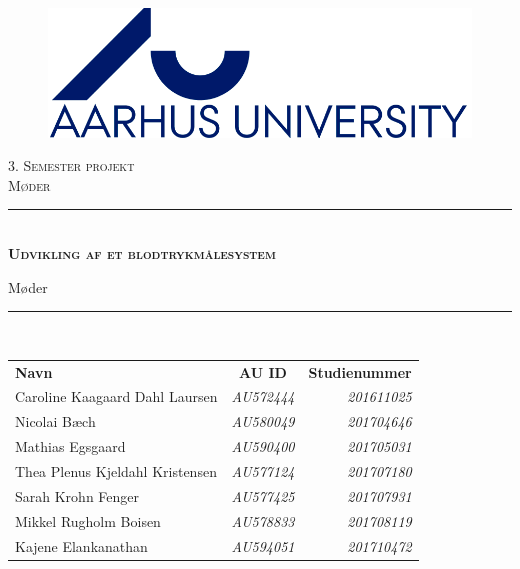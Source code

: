 \thispagestyle{empty}
\newcommand{\HRule}{\rule{\linewidth}{0.1mm}} %

\begin{center}
	\vspace{5cm}
	
	\begin{figure}[h!]
		\centering
		\includegraphics[width=0.5\linewidth]{Forside/AUlogo}
	\end{figure}
	
	\vspace{0.1 in}
	
	\textsc{\large 3. Semester projekt \\Møder}\\[1.5cm] 
	
	\HRule \\[0.8cm]
	{\huge \bfseries \textsc{Udvikling af et blodtrykmålesystem}} 

	{\LARGE Møder} \\[0.4cm]
	\HRule \\[1.5cm]
	

	
	
	\vspace{0.2 in}
	\begin{center}
		\begin{tabular}{l c r}
			\textbf{Navn} & \textbf{AU ID} & \textbf{Studienummer} \\
			Caroline Kaagaard Dahl Laursen & \textsl{AU572444} & \textsl{201611025}  \\
			Nicolai Bæch & \textsl{AU580049} & \textsl{201704646}  \\
			Mathias Egsgaard & \textsl{AU590400} & \textsl{201705031}  \\
			Thea Plenus Kjeldahl Kristensen & \textsl{AU577124} & \textsl{201707180}  \\
			Sarah Krohn Fenger & \textsl{AU577425} & \textsl{201707931}  \\
			Mikkel Rugholm Boisen & \textsl{AU578833} & \textsl{201708119}  \\
			Kajene Elankanathan & \textsl{AU594051} & \textsl{201710472}  \\
			

\end{tabular}
\end{center}
\end{center}
